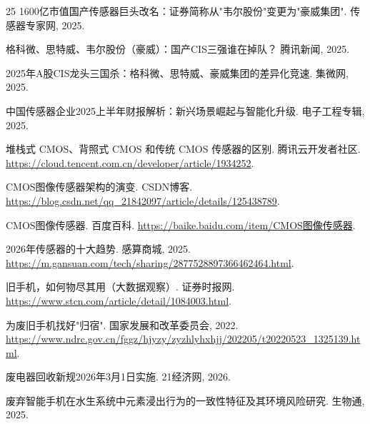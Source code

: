 \documentclass[12pt, a4paper]{ctexart}
\begin{document}
\begin{thebibliography}{25}
    1600亿市值国产传感器巨头改名：证券简称从"韦尔股份"变更为"豪威集团".
    传感器专家网, 2025.

    格科微、思特威、韦尔股份（豪威）：国产CIS三强谁在掉队？
    腾讯新闻, 2025.

    2025年A股CIS龙头三国杀：格科微、思特威、豪威集团的差异化竞速.
    集微网, 2025.

    中国传感器企业2025上半年财报解析：新兴场景崛起与智能化升级.
    电子工程专辑, 2025.

    堆栈式 CMOS、背照式 CMOS 和传统 CMOS 传感器的区别.
    腾讯云开发者社区.
    \url{https://cloud.tencent.com.cn/developer/article/1934252}.

    CMOS图像传感器架构的演变.
    CSDN博客.
    \url{https://blog.csdn.net/qq_21842097/article/details/125438789}.

    CMOS图像传感器.
    百度百科.
    \url{https://baike.baidu.com/item/CMOS图像传感器}.

    2026年传感器的十大趋势.
    感算商城, 2025.
    \url{https://m.gansuan.com/tech/sharing/2877528897366462464.html}.

    旧手机，如何物尽其用（大数据观察）.
    证券时报网.
    \url{https://www.stcn.com/article/detail/1084003.html}.

    为废旧手机找好"归宿".
    国家发展和改革委员会, 2022.
    \url{https://www.ndrc.gov.cn/fggz/hjyzy/zyzhlyhxhjj/202205/t20220523_1325139.html}.

    废电器回收新规2026年3月1日实施.
    21经济网, 2026.

    废弃智能手机在水生系统中元素浸出行为的一致性特征及其环境风险研究.
    生物通, 2025.

\end{thebibliography}
\end{document}
